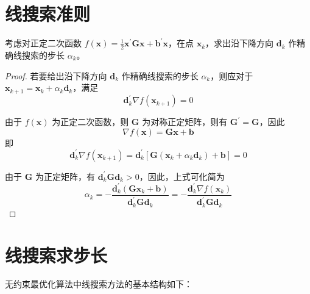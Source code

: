 \documentclass[cn,mtpro2,12pt]{elegantbook}
\begin{document}
\section{线搜索准则}

\begin{example}
    考虑对正定二次函数 $f(\mathbf{x})=\frac{1}{2}\mathbf{x}^{\prime}\mathbf{G}\mathbf{x}+\mathbf{b}^{\prime} \mathbf{x}$，在点 $\mathbf{x}_{k}$，求出沿下降方向 $\mathbf{d}_{k}$ 作精确线搜索的步长 $\alpha_{k}$。
\end{example}

\begin{proof}
    若要给出沿下降方向 $\mathbf{d}_{k}$ 作精确线搜索的步长 $\alpha_{k}$，则应对于 $\mathbf{x}_{k+1}=\mathbf{x}_{k}+\alpha_{k}\mathbf{d}_{k}$，满足
    \begin{equation}
        \mathbf{d}_{k}^{\prime}\nabla f(\mathbf{x}_{k+1})=0
    \end{equation}

    由于 $f(\mathbf{x})$ 为正定二次函数，则 $\mathbf{G}$ 为对称正定矩阵，则有 $\mathbf{G}^{\prime}=\mathbf{G}$，因此
    \begin{equation}
        \nabla f(\mathbf{x})=\mathbf{G}\mathbf{x}+\mathbf{b}
    \end{equation}
    即
    \begin{equation}
        \mathbf{d}_{k}^{\prime}\nabla f(\mathbf{x}_{k+1})=\mathbf{d}_{k}^{\prime}\left[\mathbf{G}\left(\mathbf{x}_{k}+\alpha_{k}\mathbf{d}_{k}\right)+\mathbf{b}\right]=0
    \end{equation}

    由于 $\mathbf{G}$ 为正定矩阵，有 $\mathbf{d}_{k}^{\prime}\mathbf{G}\mathbf{d}_{k}>0$，因此，上式可化简为
    \begin{equation}
        \alpha_{k}=-\frac{\mathbf{d}_{k}^{\prime}\left(\mathbf{G}\mathbf{x}_{k}+\mathbf{b}\right)}{\mathbf{d}_{k}^{\prime}\mathbf{G}\mathbf{d}_{k}}=-\frac{\mathbf{d}_{k}^{\prime}\nabla f(\mathbf{x}_{k})}{\mathbf{d}_{k}^{\prime}\mathbf{G}\mathbf{d}_{k}}
    \end{equation}
\end{proof}

\section{线搜索求步长}

无约束最优化算法中线搜索方法的基本结构如下：
\end{document}
